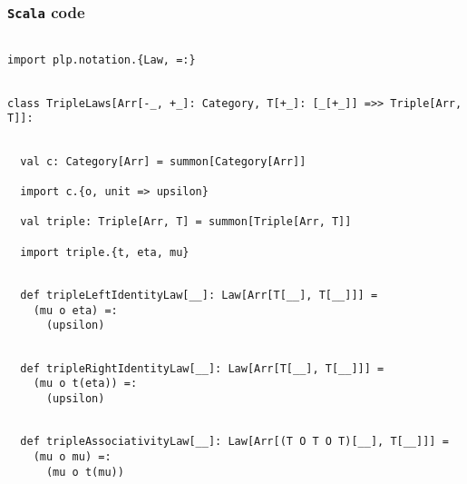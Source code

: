 \documentclass[11pt]{article}
\newcommand{\code}{\subsubsection{{\tt Scala} code}\begingroup\rm \vspace{12pt}}
\def\edefn{\endgroup\par\pagebreak[2]\addvspace{\medskipamount}}
\let\ecode=\edefn
\begin{document}
\code
\begin{mdframed}[backgroundcolor=lightgray!20] 
\begin{lstlisting}

import plp.notation.{Law, =:}
\end{lstlisting}
\end{mdframed}
\vspace{6pt}
\begin{mdframed}[backgroundcolor=lightgray!20] 
\begin{lstlisting}

class TripleLaws[Arr[-_, +_]: Category, T[+_]: [_[+_]] =>> Triple[Arr, T]]:
\end{lstlisting}
\end{mdframed}
\vspace{6pt}
\begin{mdframed}[backgroundcolor=lightgray!20] 
\begin{lstlisting}

  val c: Category[Arr] = summon[Category[Arr]]

  import c.{o, unit => upsilon}

  val triple: Triple[Arr, T] = summon[Triple[Arr, T]]

  import triple.{t, eta, mu}
\end{lstlisting}
\end{mdframed}
\vspace{6pt}
\begin{mdframed}[backgroundcolor=lightgray!20] 
\begin{lstlisting}

  def tripleLeftIdentityLaw[__]: Law[Arr[T[__], T[__]]] =
    (mu o eta) =:
      (upsilon)
\end{lstlisting}
\end{mdframed}
\vspace{6pt}
\begin{mdframed}[backgroundcolor=lightgray!20] 
\begin{lstlisting}

  def tripleRightIdentityLaw[__]: Law[Arr[T[__], T[__]]] =
    (mu o t(eta)) =:
      (upsilon)
\end{lstlisting}
\end{mdframed}
\vspace{6pt}
\begin{mdframed}[backgroundcolor=lightgray!20] 
\begin{lstlisting}  
    
  def tripleAssociativityLaw[__]: Law[Arr[(T O T O T)[__], T[__]]] =
    (mu o mu) =:
      (mu o t(mu))
\end{lstlisting}
\end{mdframed}
\ecode
\end{document}

